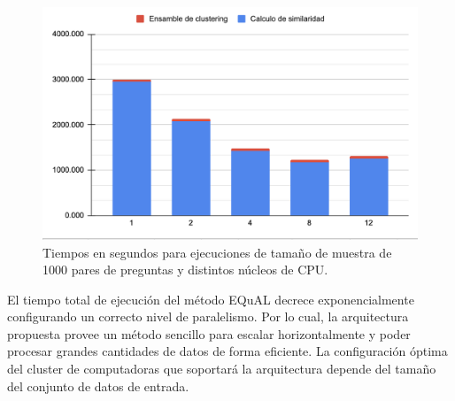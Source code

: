\begin{figure}
	\centering
	\includegraphics[width=0.7\linewidth]{10_resultados/imagenes/performance_1000}
	\caption{Tiempos en segundos para ejecuciones de tamaño de muestra de 1000 pares de preguntas y distintos núcleos de CPU.}
	\label{fig:performance1000}
\end{figure}

\bigskip El tiempo total de ejecución del método EQuAL decrece exponencialmente configurando un correcto nivel de paralelismo. Por lo cual, la arquitectura propuesta provee un método sencillo para escalar horizontalmente y poder procesar grandes cantidades de datos de forma eficiente. La configuración óptima del cluster de computadoras que soportará la arquitectura depende del tamaño del conjunto de datos de entrada.
